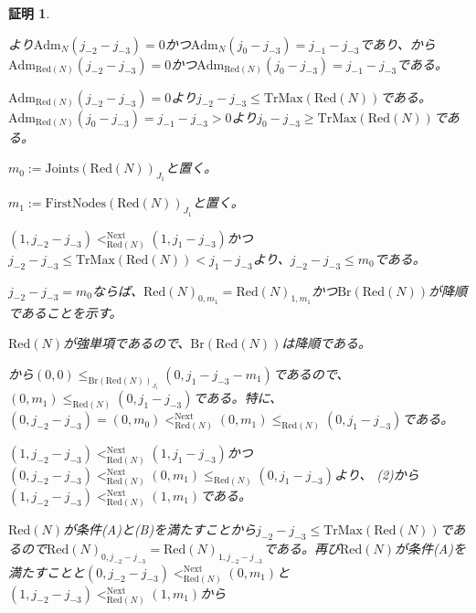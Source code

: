 \documentclass[dvipdfmx,uplatex]{jsarticle}
\theoremstyle{customnonumberbreakfortheorem}
\theoremstyle{customnonumberbreakforproof}
\newtheorem{hideableproof}{証明}
\begin{document}
\begin{hideableproof}
\begin{indented}
		\item {}より\(\textrm{Adm}_N(j_{-2}-j_{-3}) = 0\)かつ\(\textrm{Adm}_N(j_0-j_{-3}) = j_{-1}-j_{-3}\)であり、から\(\textrm{Adm}_{\textrm{Red}(N)}(j_{-2}-j_{-3}) = 0\)かつ\(\textrm{Adm}_{\textrm{Red}(N)}(j_0-j_{-3}) = j_{-1}-j_{-3}\)である。
		\item \(\textrm{Adm}_{\textrm{Red}(N)}(j_{-2}-j_{-3}) = 0\)より\(j_{-2}-j_{-3} \leq \textrm{TrMax}(\textrm{Red}(N))\)である。\(\textrm{Adm}_{\textrm{Red}(N)}(j_0-j_{-3}) = j_{-1}-j_{-3} > 0\)より\(j_0-j_{-3} \geq \textrm{TrMax}(\textrm{Red}(N))\)である。
		\item \(m_0 := \textrm{Joints}(\textrm{Red}(N))_{J_1}\)と置く。
		\item \(m_1 := \textrm{FirstNodes}(\textrm{Red}(N))_{J_1}\)と置く。
		\item \((1,j_{-2}-j_{-3}) <_{\textrm{Red}(N)}^{\textrm{Next}} (1,j_1-j_{-3})\)かつ\(j_{-2}-j_{-3} \leq \textrm{TrMax}(\textrm{Red}(N)) < j_1-j_{-3}\)より、\(j_{-2}-j_{-3} \leq m_0\)である。
		\item
		\item \(j_{-2}-j_{-3} = m_0\)ならば、\(\textrm{Red}(N)_{0,m_1} = \textrm{Red}(N)_{1,m_1}\)かつ\(\textrm{Br}(\textrm{Red}(N))\)が降順であることを示す。
		\begin{indented}
			\item \(\textrm{Red}(N)\)が強単項であるので、\(\textrm{Br}(\textrm{Red}(N))\)は降順である。
			\item {}から\((0,0) \leq_{\textrm{Br}(\textrm{Red}(N))_{J_1}} (0,j_1-j_{-3}-m_1)\)であるので、\((0,m_1) \leq_{\textrm{Red}(N)} (0,j_1-j_{-3})\)である。特に、\((0,j_{-2}-j_{-3}) = (0,m_0) <_{\textrm{Red}(N)}^{\textrm{Next}} (0,m_1) \leq_{\textrm{Red}(N)} (0,j_1-j_{-3})\)である。
			\item \((1,j_{-2}-j_{-3}) <_{\textrm{Red}(N)}^{\textrm{Next}} (1,j_1-j_{-3})\)かつ\((0,j_{-2}-j_{-3}) <_{\textrm{Red}(N)}^{\textrm{Next}} (0,m_1) \leq_{\textrm{Red}(N)} (0,j_1-j_{-3})\)より、 (2)から\((1,j_{-2}-j_{-3}) <_{\textrm{Red}(N)}^{\textrm{Next}} (1,m_1)\)である。
			\item \(\textrm{Red}(N)\)が条件(A)と(B)を満たすことから\(j_{-2}-j_{-3} \leq \textrm{TrMax}(\textrm{Red}(N))\)であるので\(\textrm{Red}(N)_{0,j_{-2}-j_{-3}} = \textrm{Red}(N)_{1,j_{-2}-j_{-3}}\)である。再び\(\textrm{Red}(N)\)が条件(A)を満たすことと\((0,j_{-2}-j_{-3}) <_{\textrm{Red}(N)}^{\textrm{Next}} (0,m_1)\)と\((1,j_{-2}-j_{-3}) <_{\textrm{Red}(N)}^{\textrm{Next}} (1,m_1)\)から

\end{indented}
\end{indented}
\end{hideableproof}
\end{document}
